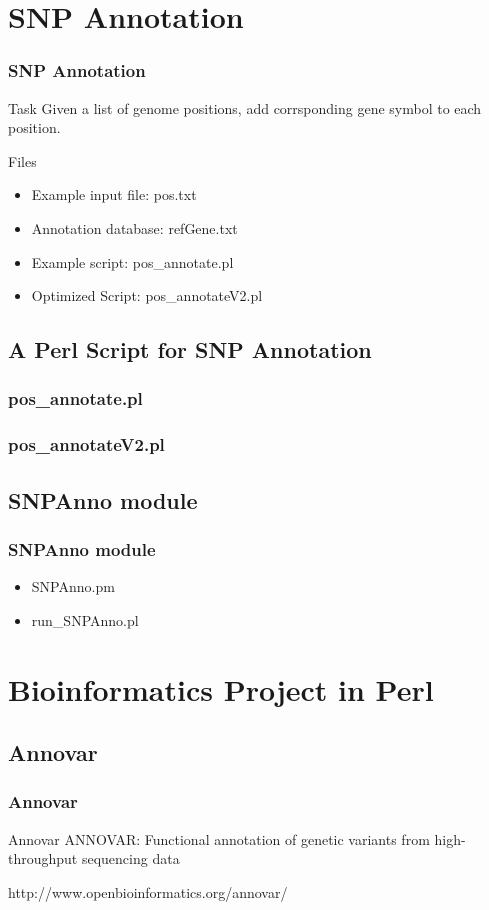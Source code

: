 \documentclass[UTF8]{beamer}
\begin{document}
\section{SNP Annotation}

\begin{frame}
  \frametitle{SNP Annotation}
  \begin{block}{Task}
    Given a list of genome positions, add corrsponding gene symbol to each
    position.
  \end{block}
  \begin{block}{Files}
    \begin{itemize}
      \item Example input file: pos.txt
      \item Annotation database: refGene.txt
      \item Example script: pos_annotate.pl
      \item Optimized Script: pos_annotateV2.pl
    \end{itemize}
  \end{block}
\end{frame}

\subsection{A Perl Script for SNP Annotation}
\begin{frame}
  \frametitle{pos_annotate.pl}
\end{frame}

\begin{frame}
  \frametitle{pos_annotateV2.pl}
\end{frame}

\subsection{SNPAnno module}

\begin{frame}
  \frametitle{SNPAnno module}
  \begin{itemize}
    \item SNPAnno.pm
    \item run_SNPAnno.pl
  \end{itemize}
\end{frame}

\section{Bioinformatics Project in Perl}
\subsection{Annovar}
\begin{frame}
  \frametitle{Annovar}
  \begin{block}{Annovar}
    ANNOVAR: Functional annotation of genetic variants from high-throughput
    sequencing data
  \end{block}
  \centerline{http://www.openbioinformatics.org/annovar/}
\end{frame}
\end{document}

